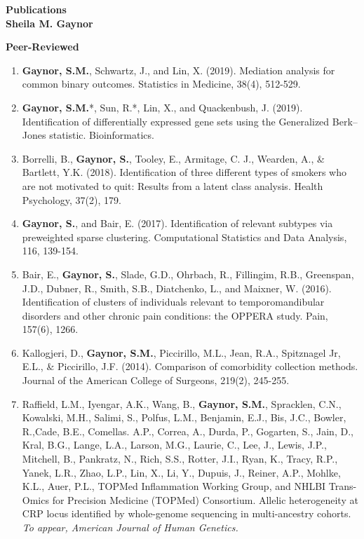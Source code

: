 \documentclass[10pt]{article}
\begin{document}
	
	\renewcommand\labelitemi{\tiny$\bullet$}
	
		\begin{center}
		\textbf{\Large Publications}\\
		\textbf{\large Sheila M. Gaynor}\\
	\end{center}

\indent \textbf{Peer-Reviewed} \\
\begin{enumerate}
\item \textbf{Gaynor, S.M.}, Schwartz, J., and Lin, X. (2019). Mediation analysis for common binary outcomes. Statistics in Medicine, 38(4), 512-529.
\item \textbf{Gaynor, S.M.}*, Sun, R.*, Lin, X., and Quackenbush, J. (2019). Identification of differentially expressed gene sets using the Generalized Berk–Jones statistic. Bioinformatics.
\item Borrelli, B., \textbf{Gaynor, S.}, Tooley, E., Armitage, C. J., Wearden, A., \& Bartlett, Y.K. (2018). Identification of three different types of smokers who are not motivated to quit: Results from a latent class analysis. Health Psychology, 37(2), 179.
\item \textbf{Gaynor, S.}, and Bair, E. (2017). Identification of relevant subtypes via preweighted sparse clustering. Computational Statistics and Data Analysis, 116, 139-154.
\item Bair, E., \textbf{Gaynor, S.}, Slade, G.D., Ohrbach, R., Fillingim, R.B., Greenspan, J.D., Dubner, R., Smith, S.B., Diatchenko, L., and Maixner, W. (2016). Identification of clusters of individuals relevant to temporomandibular disorders and other chronic pain conditions: the OPPERA study. Pain, 157(6), 1266.
\item Kallogjeri, D., \textbf{Gaynor, S.M.}, Piccirillo, M.L., Jean, R.A., Spitznagel Jr, E.L., \& Piccirillo, J.F. (2014). Comparison of comorbidity collection methods. Journal of the American College of Surgeons, 219(2), 245-255.
\item Raffield, L.M.,  Iyengar, A.K.,  Wang, B.,  \textbf{Gaynor, S.M.}, Spracklen, C.N., Kowalski, M.H., Salimi, S., Polfus, L.M., Benjamin, E.J., Bis, J.C., Bowler, R.,Cade, B.E., Comellas. A.P.,  Correa, A.,  Durda, P.,  Gogarten, S.,  Jain, D., Kral, B.G., Lange, L.A.,  Larson, M.G.,  Laurie, C., Lee, J., Lewis, J.P., Mitchell, B.,  Pankratz, N.,  Rich, S.S., Rotter, J.I., Ryan, K., Tracy, R.P., Yanek, L.R.,  Zhao, L.P., Lin, X., Li, Y., Dupuis, J., Reiner, A.P., Mohlke, K.L., Auer, P.L., TOPMed Inflammation Working Group, and NHLBI Trans-Omics for Precision Medicine (TOPMed) Consortium. Allelic heterogeneity at CRP locus identified by whole-genome sequencing in multi-ancestry cohorts. \textit{To appear, American Journal of Human Genetics.} \\
\end{enumerate}
\end{document}
